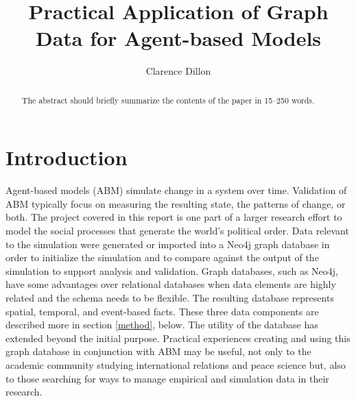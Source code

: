 \documentclass[runningheads]{llncs}
\begin{document}
%
\title{Practical Application of Graph Data for Agent-based Models}
%
%
\author{Clarence Dillon}
%
%
%
\maketitle              %
%
\begin{abstract}
The abstract should briefly summarize the contents of the paper in
15--250 words.

\end{abstract}
%
%
%
\section{Introduction\label{intro}}
Agent-based models (ABM) simulate change in a system over time.
Validation of ABM typically focus on measuring the resulting state, the patterns of change, or both.
The project covered in this report is one part of a larger research effort to model the social processes that generate the world's political order.
Data relevant to the simulation were generated or imported into a Neo4j\cite{neo4j} graph database in order to initialize the simulation and to compare against the output of the simulation to support analysis and validation.
Graph databases, such as Neo4j, have some advantages over relational databases when data elements are highly related and the schema needs to be flexible.
The resulting database represents spatial, temporal, and event-based facts.
These three data components are described more in section \ref{method}, below.
The utility of the database has extended beyond the initial purpose.
Practical experiences creating and using this graph database in conjunction with ABM may be useful, not only to the academic community studying international relations and peace science but, also to those searching for ways to manage empirical and simulation data in their research.
\end{document}
